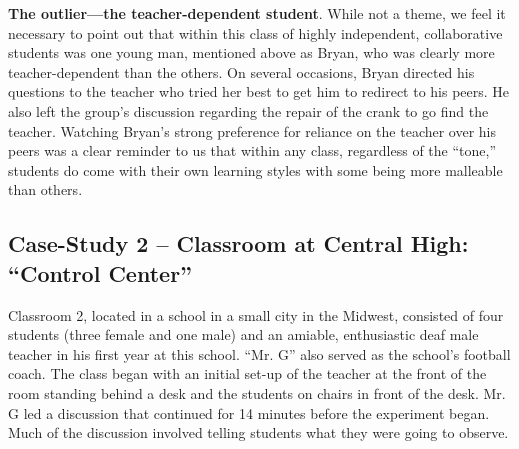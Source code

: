 \documentclass[11.5pt]{sig-alternate} %
\begin{document}
\begin{large}
\textbf{The outlier—the teacher-dependent student}. While not a theme, we feel it necessary to point out that within this class of highly independent, collaborative students was one young man, mentioned above as Bryan, who was clearly more teacher-dependent than the others.  On several occasions, Bryan directed his questions to the teacher who tried her best to get him to redirect to his peers.  He also left the group’s discussion regarding the repair of the crank to go find the teacher.  Watching Bryan’s strong preference for reliance on the teacher over his peers was a clear reminder to us that within any class, regardless of the “tone,” students do come with their own learning styles with some being more malleable than others.  

\subsection*{Case-Study 2 – Classroom at Central High:  “Control Center”}

Classroom 2, located in a school in a small city in the Midwest, consisted of four students (three female and one male) and an amiable, enthusiastic deaf male teacher in his first year at this school.  “Mr. G” also served as the school’s football coach. The class began with an initial set-up of the teacher at the front of the room standing behind a desk and the students on chairs in front of the desk.  Mr. G led a discussion that continued for 14 minutes before the experiment began.  Much of the discussion involved telling students what they were going to observe.  


\end{large}
\end{document}
